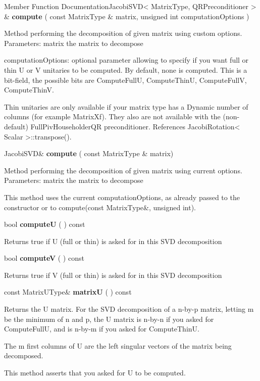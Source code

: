 \vspace{0.3cm}
Member Function DocumentationJacobiSVD< MatrixType, QRPreconditioner > \& \textbf{compute}  ( const MatrixType \&  matrix,  unsigned int  computationOptions  )   

Method performing the decomposition of given matrix using custom options. 
Parameters: matrix the matrix to decompose  

computationOptions: optional parameter allowing to specify if you want full or thin U or V unitaries to be computed. By default, none is computed. This is a bit-field, the possible bits are ComputeFullU, ComputeThinU, ComputeFullV, ComputeThinV. 

Thin unitaries are only available if your matrix type has a Dynamic number of columns (for example MatrixXf). They also are not available with the (non-default) FullPivHouseholderQR preconditioner. 
References JacobiRotation< Scalar >::transpose().

\vspace{0.3cm}
JacobiSVD\& \textbf{compute}  ( const MatrixType \&  matrix)   

Method performing the decomposition of given matrix using current options. 
Parameters: matrix the matrix to decompose 

This method uses the current computationOptions, as already passed to the constructor or to compute(const MatrixType\&, unsigned int). 


\vspace{0.3cm}
bool \textbf{computeU}  ( )  const 

Returns true if U (full or thin) is asked for in this SVD decomposition 


\vspace{0.3cm}
bool \textbf{computeV}  ( )  const 

Returns true if V (full or thin) is asked for in this SVD decomposition 


\vspace{0.3cm}
const MatrixUType\& \textbf{matrixU}  ( )  const 

Returns the U matrix. For the SVD decomposition of a n-by-p matrix, letting m be the minimum of n and p, the U matrix is n-by-n if you asked for ComputeFullU, and is n-by-m if you asked for ComputeThinU.

The m first columns of U are the left singular vectors of the matrix being decomposed.

This method asserts that you asked for U to be computed. 


